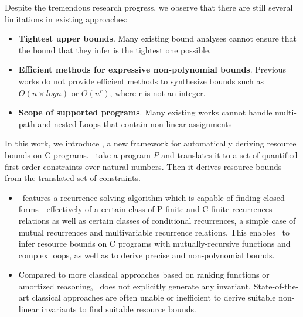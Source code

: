 Despite the tremendous research progress,  we observe that there are still several limitations in existing approaches:
\begin{itemize}
	\item \textbf{Tightest upper bounds}.  Many existing bound analyses cannot ensure that the bound that they infer is the tightest one possible.
	\item \textbf{Efficient methods for expressive non-polynomial bounds}. Previous works do not provide efficient methods to synthesize bounds such as $O(n \times log n)$ or $O(n^r)$, where r is not an integer.
	\item  \textbf{Scope of supported programs}. Many existing works cannot handle multi-path and nested Loops that contain non-linear assignments
\end{itemize}

In this work, we introduce \SystemName, a new framework for automatically deriving resource bounds on C programs. 
\SystemName\ take a program $P$ and translates it to a set of  quantified first-order constraints over natural numbers. 
Then it derives resource bounds from the translated set of constraints.

\begin{itemize}
	\item \SystemName\ features a recurrence solving algorithm which is capable of finding closed forms—effectively of a certain class of P-finite and C-finite recurrences relations as well as certain classes of conditional
	recurrences, a simple case of mutual recurrences and multivariable recurrence relations.  
	This enables 
	\SystemName\ to infer resource bounds on C programs with mutually-recursive functions and  complex loops, as well as to derive precise and non-polynomial bounds.
	\item Compared to more classical approaches based on ranking functions or amortized reasoning, \SystemName\ does not explicitly generate any invariant.
	State-of-the-art classical approaches are often unable or inefficient to derive suitable non-linear invariants to find suitable resource bounds. 
	
\end{itemize}

